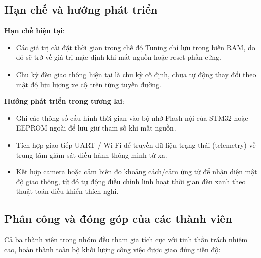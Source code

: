 \subsection{Hạn chế và hướng phát triển}
\textbf{Hạn chế hiện tại}:
\begin{itemize}
    \item Các giá trị cài đặt thời gian trong chế độ Tuning chỉ lưu trong biến RAM, do đó sẽ trở về giá trị mặc định khi mất nguồn hoặc reset phần cứng.
    \item Chu kỳ đèn giao thông hiện tại là chu kỳ cố định, chưa tự động thay đổi theo mật độ lưu lượng xe cộ trên từng tuyến đường.
\end{itemize}

\textbf{Hướng phát triển trong tương lai}:
\begin{itemize}
    \item Ghi các thông số cấu hình thời gian vào bộ nhớ Flash nội của STM32 hoặc EEPROM ngoài để lưu giữ tham số khi mất nguồn.
    \item Tích hợp giao tiếp UART / Wi-Fi để truyền dữ liệu trạng thái (telemetry) về trung tâm giám sát điều hành thông minh từ xa.
    \item Kết hợp camera hoặc cảm biến đo khoảng cách/cảm ứng từ để nhận diện mật độ giao thông, từ đó tự động điều chỉnh linh hoạt thời gian đèn xanh theo thuật toán điều khiển thích nghi.
\end{itemize}

\subsection{Phân công và đóng góp của các thành viên}
Cả ba thành viên trong nhóm đều tham gia tích cực với tinh thần trách nhiệm cao, hoàn thành toàn bộ khối lượng công việc được giao đúng tiến độ:

